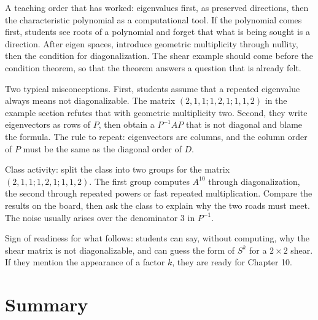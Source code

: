 \begin{untukdosen}
A teaching order that has worked: eigenvalues first, as preserved directions, then the
characteristic polynomial as a computational tool. If the polynomial comes first, students see
roots of a polynomial and forget that what is being sought is a direction. After eigen spaces,
introduce geometric multiplicity through nullity, then the condition for diagonalization. The
shear example should come before the condition theorem, so that the theorem answers a question
that is already felt.

Two typical misconceptions. First, students assume that a repeated eigenvalue always means not
diagonalizable. The matrix $(2,1,1;1,2,1;1,1,2)$ in the example section refutes that with
geometric multiplicity two. Second, they write eigenvectors as rows of $P$, then obtain a
$P^{-1}AP$ that is not diagonal and blame the formula. The rule to repeat: eigenvectors are
columns, and the column order of $P$ must be the same as the diagonal order of $D$.

Class activity: split the class into two groups for the matrix $(2,1,1;1,2,1;1,1,2)$. The first
group computes $A^{10}$ through diagonalization, the second through repeated powers or fast
repeated multiplication. Compare the results on the board, then ask the class to explain why the
two roads must meet. The noise usually arises over the denominator $3$ in $P^{-1}$.

Sign of readiness for what follows: students can say, without computing, why the shear matrix is
not diagonalizable, and can guess the form of $S^{k}$ for a $2\times2$ shear. If they mention the
appearance of a factor $k$, they are ready for Chapter 10.
\end{untukdosen}

\section{Summary}

